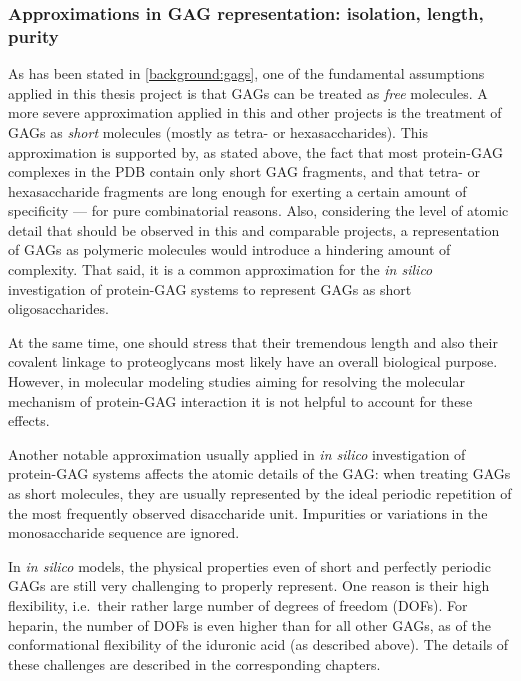 
\subsubsection{Approximations in GAG representation: isolation, length, purity}

As has been stated in \cref{background:gags}, one of the fundamental assumptions
applied in this thesis project is that GAGs can be treated as \textit{free}
molecules. A more severe approximation applied in this and other projects is the
treatment of GAGs as \textit{short} molecules (mostly as tetra- or
hexasaccharides). This approximation is supported by, as stated above, the fact
that most protein-GAG complexes in the PDB contain only short GAG fragments, and
that tetra- or hexasaccharide fragments are long enough for exerting a certain
amount of specificity --- for pure combinatorial reasons. Also, considering the
level of atomic detail that should be observed in this and comparable projects,
a representation of GAGs as polymeric molecules would introduce a hindering
amount of complexity. That said, it is a common approximation for the
\textit{in silico} investigation of protein-GAG systems to represent GAGs as
short oligosaccharides.

At the same time, one should stress that their tremendous length and also their
covalent linkage to proteoglycans most likely have an overall biological
purpose. However, in molecular modeling studies aiming for resolving the
molecular mechanism of protein-GAG interaction it is not helpful to account for
these effects.

Another notable approximation usually applied in \textit{in silico}
investigation of protein-GAG systems affects the atomic details of the GAG: when
treating GAGs as short molecules, they are usually represented by the ideal
periodic repetition of the most frequently observed disaccharide unit.
Impurities or variations in the monosaccharide sequence are ignored.

In \textit{in silico} models, the physical properties even of short and
perfectly periodic GAGs are still very challenging to properly represent. One
reason is their high flexibility, i.e.\ their rather large number of degrees of
freedom (DOFs). For heparin, the number of DOFs is even higher than for all
other GAGs, as of the conformational flexibility of the iduronic acid (as
described above). The details of these challenges are described in the
corresponding chapters.

